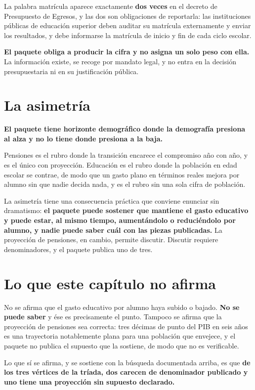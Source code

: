 La palabra matrícula aparece exactamente \textbf{dos veces} en el decreto de
Presupuesto de Egresos, y las dos son obligaciones de reportarla: las
instituciones públicas de educación superior deben auditar su matrícula
externamente y enviar los resultados, y debe informarse la matrícula de inicio y
fin de cada ciclo escolar.

\textbf{El paquete obliga a producir la cifra y no asigna un solo peso con ella.}
La información existe, se recoge por mandato legal, y no entra en la decisión
presupuestaria ni en su justificación pública.

\section{La asimetría}

\textbf{El paquete tiene horizonte demográfico donde la demografía presiona al
alza y no lo tiene donde presiona a la baja.}

Pensiones es el rubro donde la transición encarece el compromiso año con año, y es
el único con proyección. Educación es el rubro donde la población en edad escolar
se contrae, de modo que un gasto plano en términos reales mejora por alumno sin
que nadie decida nada, y es el rubro sin una sola cifra de población.

La asimetría tiene una consecuencia práctica que conviene enunciar sin
dramatismo: \textbf{el paquete puede sostener que mantiene el gasto educativo y
puede estar, al mismo tiempo, aumentándolo o reduciéndolo por alumno, y nadie
puede saber cuál con las piezas publicadas.} La proyección de pensiones, en
cambio, permite discutir. Discutir requiere denominadores, y el paquete publica
uno de tres.

\section{Lo que este capítulo no afirma}

No se afirma que el gasto educativo por alumno haya subido o bajado. \textbf{No se
puede saber} y ése es precisamente el punto. Tampoco se afirma que la proyección
de pensiones sea correcta: tres décimas de punto del PIB en seis años es una
trayectoria notablemente plana para una población que envejece, y el paquete no
publica el supuesto que la sostiene, de modo que no es verificable.

Lo que sí se afirma, y se sostiene con la búsqueda documentada arriba, es que
\textbf{de los tres vértices de la tríada, dos carecen de denominador publicado y
uno tiene una proyección sin supuesto declarado.}

\clearpage

